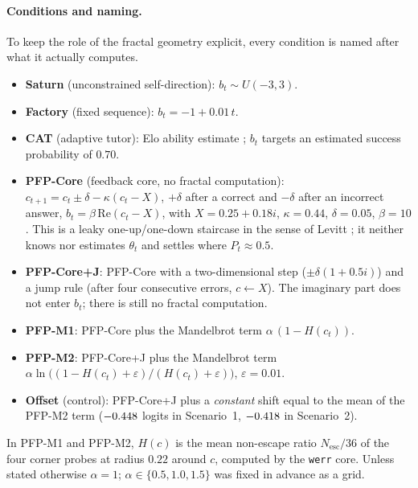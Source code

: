 \paragraph{Conditions and naming.} To keep the role of the fractal geometry explicit, every condition is named after what it actually computes.
\begin{itemize}[leftmargin=*,nosep]
  \item \textbf{Saturn} (unconstrained self-direction): $b_t \sim U(-3, 3)$.
  \item \textbf{Factory} (fixed sequence): $b_t = -1 + 0.01\,t$.
  \item \textbf{CAT} (adaptive tutor): Elo ability estimate \cite{pelanek2016elo}; $b_t$ targets an estimated success probability of $0.70$.
  \item \textbf{PFP-Core} (feedback core, no fractal computation): $c_{t+1} = c_t \pm \delta - \kappa(c_t - X)$, $+\delta$ after a correct and $-\delta$ after an incorrect answer, $b_t = \beta\,\mathrm{Re}(c_t - X)$, with $X = 0.25 + 0.18i$, $\kappa = 0.44$, $\delta = 0.05$, $\beta = 10$. This is a leaky one-up/one-down staircase in the sense of Levitt \cite{levitt1971transformed}; it neither knows nor estimates $\theta_t$ and settles where $P_t \approx 0.5$.
  \item \textbf{PFP-Core+J}: PFP-Core with a two-dimensional step ($\pm\delta(1 + 0.5i)$) and a jump rule (after four consecutive errors, $c \leftarrow X$). The imaginary part does not enter $b_t$; there is still no fractal computation.
  \item \textbf{PFP-M1}: PFP-Core plus the Mandelbrot term $\alpha\,(1 - H(c_t))$.
  \item \textbf{PFP-M2}: PFP-Core+J plus the Mandelbrot term $\alpha \ln\!\big((1 - H(c_t) + \varepsilon)/(H(c_t) + \varepsilon)\big)$, $\varepsilon = 0.01$.
  \item \textbf{Offset} (control): PFP-Core+J plus a \emph{constant} shift equal to the mean of the PFP-M2 term ($-0.448$ logits in Scenario~1, $-0.418$ in Scenario~2).
\end{itemize}
In PFP-M1 and PFP-M2, $H(c)$ is the mean non-escape ratio $N_{\text{esc}}/36$ of the four corner probes at radius $0.22$ around $c$, computed by the \texttt{werr} core. Unless stated otherwise $\alpha = 1$; $\alpha \in \{0.5, 1.0, 1.5\}$ was fixed in advance as a grid.

